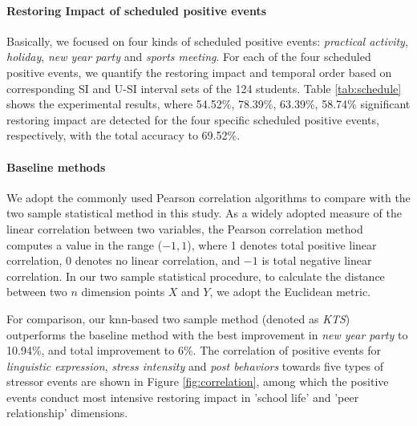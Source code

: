 
\paragraph{Restoring Impact of scheduled positive events}
Basically, we focused on four kinds of scheduled positive events:
\emph{practical activity}, \emph{holiday}, \emph{new year party} and \emph{sports meeting}.
For each of the four scheduled positive events,
we quantify the restoring impact and temporal order
based on corresponding SI and U-SI interval sets of the 124 students.
Table \ref{tab:schedule} shows the experimental results,
where 54.52\%, 78.39\%, 63.39\%, 58.74\% significant restoring impact are detected for the four specific scheduled positive events, respectively, with the total accuracy to 69.52\%.

\paragraph{Baseline methods}
We adopt the commonly used Pearson correlation algorithms to compare with the two sample statistical method in this study.
As a widely adopted measure of the linear correlation between two variables,
the Pearson correlation method computes a value in the range ($-1,1$),
where 1 denotes total positive linear correlation,
0 denotes no linear correlation,
and $-1$ is total negative linear correlation.
In our two sample statistical procedure,
to calculate the distance between two $n$ dimension points $X$ and $Y$,
we adopt the Euclidean metric.

For comparison,
our knn-based two sample method (denoted as \emph{KTS}) outperforms the baseline method
with the best improvement in \emph{new year party} to 10.94\%,
and total improvement to 6\%.
The correlation of positive events for \emph{linguistic expression},
\emph{stress intensity} and \emph{post behaviors} towards five types of stressor events
are shown in Figure \ref{fig:correlation},
among which the positive events conduct most intensive restoring impact in 'school life' and 'peer relationship' dimensions.

